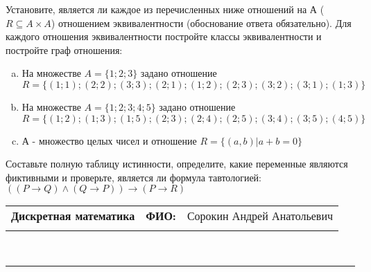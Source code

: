 \documentclass[10pt]{exam}
\newcommand{\class}{Дискретная математика}
\newcommand{\examdate}{}
\begin{document}
\begin{questions}
\question
Установите, является ли каждое из перечисленных ниже отношений на А ($R \subseteq A \times A$) отношением эквивалентности (обоснование ответа обязательно). Для каждого отношения эквивалентности постройте классы 
эквивалентности и постройте граф отношения:
\begin{enumerate} [a)]\setcounter{enumi}{0}
\item На множестве $A = \{1; 2; 3\}$ задано отношение $R = \{(1; 1); (2; 2); (3; 3); (2; 1); (1; 2); (2; 3); (3; 2); (3; 1); (1; 3)\}$
\item На множестве $A = \{1; 2; 3; 4; 5\}$ задано отношение $R = \{(1; 2); (1; 3); (1; 5); (2; 3); (2; 4); (2; 5); (3; 4); (3; 5); (4; 5)\}$
\item А - множество целых чисел и отношение $R = \{(a,b)|a + b = 0\}$
\end{enumerate}\question Составьте полную таблицу истинности, определите, какие переменные являются фиктивными и проверьте, является ли формула тавтологией:
$(( P \rightarrow Q) \land (Q \rightarrow P)) \rightarrow (P \rightarrow R)$

\end{questions}
\newpage
\begin{flushright}
\begin{tabular}{p{2.8in} r l}
\textbf{\class} & \textbf{ФИО:} &Сорокин Андрей Анатольевич
\\

\textbf{\examdate} &&\\
\end{tabular}\\
\end{flushright}
\rule[1ex]{\textwidth}{.1pt}
\end{document}
